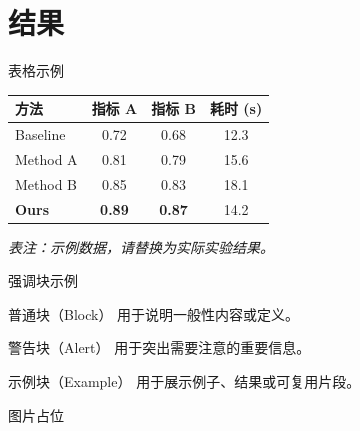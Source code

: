 \documentclass[10pt,aspectratio=169,mathserif]{beamer}
\begin{document}
\section{结果}

\begin{frame}{表格示例}
\begin{table}
\centering
\begin{tabular}{lccc}
\toprule
\textbf{方法} & \textbf{指标 A} & \textbf{指标 B} & \textbf{耗时 (s)} \\
\midrule
Baseline     & 0.72 & 0.68 & 12.3 \\
Method A     & 0.81 & 0.79 & 15.6 \\
Method B     & 0.85 & 0.83 & 18.1 \\
\textbf{Ours}& \textbf{0.89} & \textbf{0.87} & 14.2 \\
\bottomrule
\end{tabular}
\end{table}

\vspace{0.4cm}
\begin{center}
\small\textit{表注：示例数据，请替换为实际实验结果。}
\end{center}
\end{frame}

\begin{frame}{强调块示例}
    \begin{block}{普通块（Block）}
        用于说明一般性内容或定义。
    \end{block}

    \begin{alertblock}{警告块（Alert）}
        用于突出需要注意的重要信息。
    \end{alertblock}

    \begin{exampleblock}{示例块（Example）}
        用于展示例子、结果或可复用片段。
    \end{exampleblock}
\end{frame}

\begin{frame}{图片占位}
    \begin{center}
    \end{center}
\end{frame}
\end{document}

